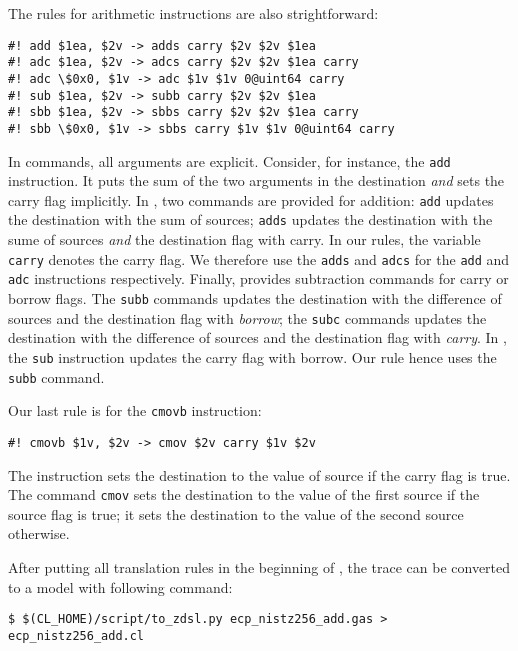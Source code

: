 \documentclass{amsproc}
\begin{document}
The rules for arithmetic instructions are also strightforward:
\begin{verbatim}
#! add $1ea, $2v -> adds carry $2v $2v $1ea
#! adc $1ea, $2v -> adcs carry $2v $2v $1ea carry
#! adc \$0x0, $1v -> adc $1v $1v 0@uint64 carry
#! sub $1ea, $2v -> subb carry $2v $2v $1ea
#! sbb $1ea, $2v -> sbbs carry $2v $2v $1ea carry
#! sbb \$0x0, $1v -> sbbs carry $1v $1v 0@uint64 carry
\end{verbatim}
In \cryptoline commands, all arguments are explicit. Consider, for
instance, the \xeightysix \texttt{add} instruction. It puts the sum of the
two arguments in the destination \emph{and} sets the carry flag
implicitly. In \cryptoline, two commands are provided for addition:
\texttt{add} updates the destination with the sum of sources;
\texttt{adds} updates the destination with the sume of sources
\emph{and} the destination flag with carry. In our rules, the
\cryptoline variable \texttt{carry} denotes the carry flag. We
therefore use the \texttt{adds} and \texttt{adcs} for the \xeightysix
\texttt{add} and \texttt{adc} instructions respectively. Finally,
\cryptoline provides subtraction commands for carry or borrow
flags. The \texttt{subb} commands updates the destination with the
difference of sources and the destination flag with \emph{borrow}; the
\texttt{subc} commands updates the destination with the difference of
sources and the destination flag with \emph{carry}. In \xeightysix, the
\texttt{sub} instruction updates the carry flag with borrow. Our rule
hence uses the \cryptoline \texttt{subb} command.

Our last rule is for the \xeightysix \texttt{cmovb} instruction:
\begin{verbatim}
#! cmovb $1v, $2v -> cmov $2v carry $1v $2v
\end{verbatim}
The instruction sets the destination to the value of source if the
carry flag is true. The \cryptoline command \texttt{cmov} sets the
destination to the value of the first source if the source flag is
true; it sets the destination to the value of the second source
otherwise.

After putting all translation rules in the beginning of \nistzaddgas,
the \xeightysix trace can be converted to a \cryptoline model with
following command:
\begin{verbatim}
$ $(CL_HOME)/script/to_zdsl.py ecp_nistz256_add.gas > ecp_nistz256_add.cl
\end{verbatim}
\end{document}
